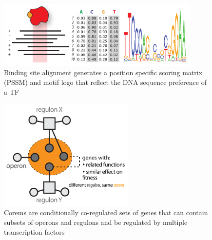 \documentclass{article}
\begin{document}
\begin{figure}[h!]
    \centering
    \includegraphics[width=0.9\textwidth]{figures/pssm}
 	\caption[Binding site alignment generates a position specific scoring matrix (PSSM) and motif logo that reflect the DNA sequence preference of a TF]{Binding site alignment generates a position specific scoring matrix (PSSM) and motif logo that reflect the DNA sequence preference of a TF}
    \label{fig:chap1:pssm}
\end{figure}

\begin{figure}[h!]
    \centering
    \includegraphics[width=0.6\textwidth]{figures/corem}
 	\caption[Corems are conditionally co-regulated sets of genes that can contain subsets of operons and regulons and be regulated by multiple transcription factors]{Corems are conditionally co-regulated sets of genes that can contain subsets of operons and regulons and be regulated by multiple transcription factors}
    \label{fig:chap1:corem}
\end{figure}
\end{document}
